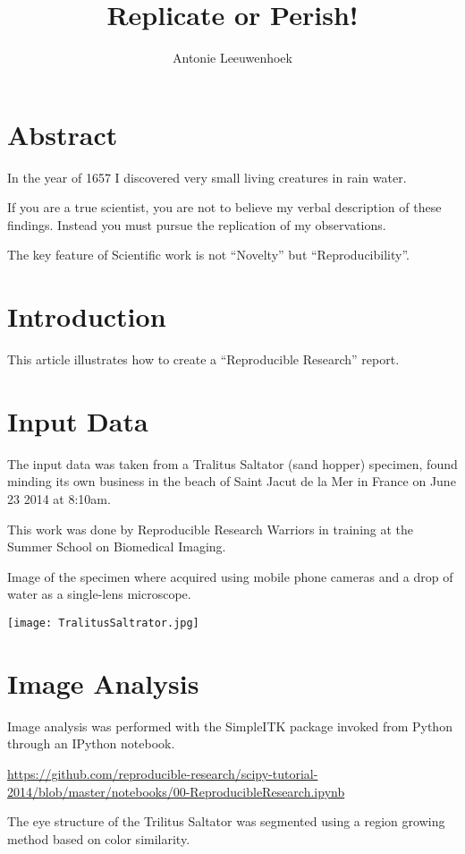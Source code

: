 \documentclass{article}
\title{Replicate or Perish!}
\author{Antonie Leeuwenhoek}
\begin{document}
\maketitle

\section{Abstract}

In the year of 1657 I discovered very small living creatures in rain water.

If you are a true scientist, you are not to believe my verbal description of these
findings. Instead you must pursue the replication of my observations.

The key feature of Scientific work is not ``Novelty'' but ``Reproducibility''.

\section{Introduction}

This article illustrates how to create a ``Reproducible Research'' report.

\section{Input Data}

The input data was taken from a Tralitus Saltator (sand hopper) specimen, found
minding its own business in the beach of Saint Jacut de la Mer in France on
June 23 2014 at 8:10am.

This work was done by Reproducible Research Warriors in training at the Summer
School on Biomedical Imaging.

Image of the specimen where acquired using mobile phone cameras and a drop of
water as a single-lens microscope.

\texttt{[image: TralitusSaltrator.jpg]}

\section{Image Analysis}

Image analysis was performed with the SimpleITK package invoked from Python
through an IPython notebook.

\url{https://github.com/reproducible-research/scipy-tutorial-2014/blob/master/notebooks/00-ReproducibleResearch.ipynb}

The eye structure of the Trilitus Saltator was segmented using a region growing
method based on color similarity.
\end{document}
